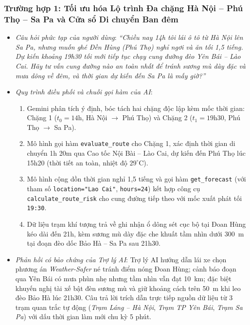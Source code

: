 \subsubsection{Trường hợp 1: Tối ưu hóa Lộ trình Đa chặng Hà Nội -- Phú Thọ -- Sa Pa và Cửa sổ Di chuyển Ban đêm}
\begin{itemize}
    \item \textit{Câu hỏi phức tạp của người dùng}: \textit{``Chiều nay 14h tôi lái ô tô từ Hà Nội lên Sa Pa, nhưng muốn ghé Đền Hùng (Phú Thọ) nghỉ ngơi và ăn tối 1,5 tiếng. Dự kiến khoảng 19h30 tối mới tiếp tục chạy cung đường đèo Yên Bái -- Lào Cai. Hãy tư vấn cung đường nào an toàn nhất để tránh sương mù dày đặc và mưa dông về đêm, và thời gian dự kiến đến Sa Pa là mấy giờ?''}
    \item \textit{Quy trình điều phối và chuỗi gọi hàm của AI}:
    \begin{enumerate}
        \item Gemini phân tích ý định, bóc tách hai chặng độc lập kèm mốc thời gian: Chặng 1 ($t_0 = 14\text{h}$, Hà Nội $\to$ Phú Thọ) và Chặng 2 ($t_1 = 19\text{h}30$, Phú Thọ $\to$ Sa Pa).
        \item Mô hình gọi hàm \texttt{evaluate\_route} cho Chặng 1, xác định thời gian di chuyển 1h 20m qua Cao tốc Nội Bài -- Lào Cai, dự kiến đến Phú Thọ lúc 15h20 (thời tiết an toàn, nhiệt độ $29^\circ\text{C}$).
        \item Mô hình cộng dồn thời gian nghỉ 1,5 tiếng và gọi hàm \texttt{get\_forecast} (với tham số \texttt{location="Lao Cai"}, \texttt{hours=24}) kết hợp công cụ \texttt{calculate\_route\_risk} cho cung đường tiếp theo với mốc xuất phát tối \texttt{19:30}.
        \item Dữ liệu trạm khí tượng trả về ghi nhận ổ dông sét cục bộ tại Đoan Hùng kéo dài đến 21h, kèm sương mù dày đặc che khuất tầm nhìn dưới 300~m tại đoạn đèo dốc Bảo Hà -- Sa Pa sau 21h30.
    \end{enumerate}
    \item \textit{Phản hồi có bảo chứng của Trợ lý AI}: Trợ lý AI hướng dẫn lái xe chọn phương án \textit{Weather-Safer} né tránh điểm nóng Đoan Hùng; cảnh báo đoạn qua Yên Bái có mưa phùn nhẹ nhưng tầm nhìn vẫn đạt 10~km; đặc biệt khuyến nghị tài xế bật đèn sương mù và giữ khoảng cách trên 50~m khi leo đèo Bảo Hà lúc 21h30. Câu trả lời trích dẫn trực tiếp nguồn dữ liệu từ 3 trạm quan trắc tự động (\textit{Trạm Láng -- Hà Nội}, \textit{Trạm TP Yên Bái}, \textit{Trạm Sa Pa}) với dấu thời gian làm mới chu kỳ 5 phút.
\end{itemize}

